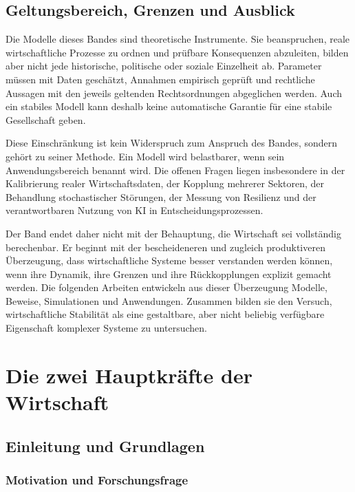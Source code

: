 \documentclass[a4paper, 12pt, twoside, openright]{report}
\theoremstyle{definition}
\theoremstyle{definition}
\begin{document}
\section{Geltungsbereich, Grenzen und Ausblick}

Die Modelle dieses Bandes sind theoretische Instrumente. Sie beanspruchen, reale
wirtschaftliche Prozesse zu ordnen und prüfbare Konsequenzen abzuleiten, bilden
aber nicht jede historische, politische oder soziale Einzelheit ab. Parameter
müssen mit Daten geschätzt, Annahmen empirisch geprüft und rechtliche Aussagen
mit den jeweils geltenden Rechtsordnungen abgeglichen werden. Auch ein stabiles
Modell kann deshalb keine automatische Garantie für eine stabile Gesellschaft
geben.

Diese Einschränkung ist kein Widerspruch zum Anspruch des Bandes, sondern gehört
zu seiner Methode. Ein Modell wird belastbarer, wenn sein Anwendungsbereich
benannt wird. Die offenen Fragen liegen insbesondere in der Kalibrierung realer
Wirtschaftsdaten, der Kopplung mehrerer Sektoren, der Behandlung stochastischer
Störungen, der Messung von Resilienz und der verantwortbaren Nutzung von KI in
Entscheidungsprozessen.

Der Band endet daher nicht mit der Behauptung, die Wirtschaft sei vollständig
berechenbar. Er beginnt mit der bescheideneren und zugleich produktiveren
Überzeugung, dass wirtschaftliche Systeme besser verstanden werden können, wenn
ihre Dynamik, ihre Grenzen und ihre Rückkopplungen explizit gemacht werden. Die
folgenden Arbeiten entwickeln aus dieser Überzeugung Modelle, Beweise,
Simulationen und Anwendungen. Zusammen bilden sie den Versuch, wirtschaftliche
Stabilität als eine gestaltbare, aber nicht beliebig verfügbare Eigenschaft
komplexer Systeme zu untersuchen.

\cleardoublepage

\chapter{Die zwei Hauptkräfte der Wirtschaft}
\label{ch:two-forces}

\section{Einleitung und Grundlagen}

\subsection{Motivation und Forschungsfrage}
\end{document}
